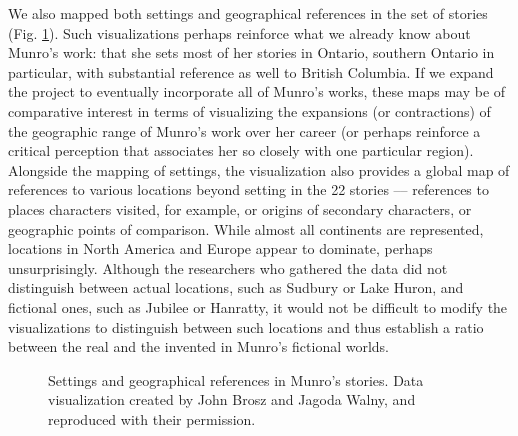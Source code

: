 \begin{paper}
We also mapped both settings and geographical references in the set of
stories (Fig. \ref{fig:wiens4}). Such visualizations perhaps reinforce what we
already know about Munro's work: that she sets most of her stories in
Ontario, southern Ontario in particular, with substantial reference as
well to British Columbia. If we expand the project to eventually
incorporate all of Munro's works, these maps may be of comparative
interest in terms of visualizing the expansions (or contractions) of the
geographic range of Munro's work over her career (or perhaps reinforce a
critical perception that associates her so closely with one particular
region). Alongside the mapping of settings, the visualization also
provides a global map of references to various locations beyond setting
in the 22 stories –– references to places characters visited, for
example, or origins of secondary characters, or geographic points of
comparison. While almost all continents are represented, locations in
North America and Europe appear to dominate, perhaps unsurprisingly.
Although the researchers who gathered the data did not distinguish
between actual locations, such as Sudbury or Lake Huron, and fictional
ones, such as Jubilee or Hanratty, it would not be difficult to modify
the visualizations to distinguish between such locations and thus
establish a ratio between the real and the invented in Munro's fictional
worlds.
\begin{figure}[t]
    \centering
    \caption{Settings and geographical references in Munro's stories. Data visualization created by John Brosz and Jagoda Walny, and reproduced with their permission.}
    \label{fig:wiens4}
\end{figure}


\end{paper}
